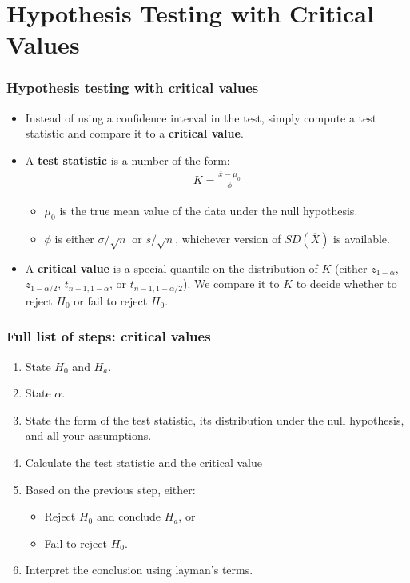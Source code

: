 \documentclass[handout]{beamer}\usepackage{graphicx, color}
\providecommand{\ov}[1]{\overline{#1}}
\numberwithin{equation}{section}
\begin{document}
\section{Hypothesis Testing with Critical Values}

\begin{frame}
\frametitle{Hypothesis testing with critical values}
\begin{itemize}
\item Instead of using a confidence interval in the test, simply compute a test statistic and compare it to a {\bf critical value}.
\pause \item A {\bf test statistic} is a number of the form: 
\begin{align*}
K = \frac{\ov{x} - \mu_0}{\phi}
\end{align*}
\begin{itemize}
\pause \item $\mu_0$ is the true mean value of the data under the null hypothesis.
\pause \item $\phi$ is either $\sigma/\sqrt{n}$ or $s/\sqrt{n}$, whichever version of $SD(\ov{X})$ is available.
\end{itemize}
\pause \item A {\bf critical value} is a special quantile on the distribution of $K$ (either $z_{1 - \alpha}$, $z_{1 - \alpha/2}$, $t_{n - 1, 1 - \alpha}$, or $t_{n - 1, 1 - \alpha/2}$). We compare it to $K$ to decide whether to reject $H_0$ or fail to reject $H_0$.
\end{itemize}
\end{frame}


\begin{frame}
\frametitle{Full list of steps: critical values}
\begin{enumerate}[1. ]
\item State $H_0$ and $H_a$.
\pause \item State $\alpha$.
\pause \item State the form of the test statistic, its distribution under the null hypothesis, and all your assumptions.
\pause \item Calculate the test statistic and the critical value
\pause \item Based on the previous step, either:
\begin{itemize}
\pause \item Reject $H_0$ and conclude $H_a$, or
\pause \item Fail to reject $H_0$.
\end{itemize}
\pause \item Interpret the conclusion using layman's terms.
\end{enumerate}
\end{frame}
\end{document}
